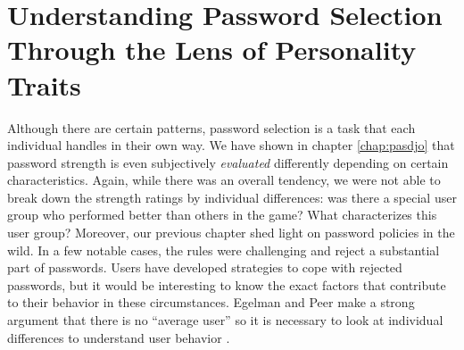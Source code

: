 \chapter[Password Personality]{Understanding Password Selection Through the Lens of Personality Traits}\label{chap:pws_and_personality}

Although there are certain patterns, password selection is a task that each individual handles in their own way. 
We have shown in chapter \ref{chap:pasdjo} that password strength is even subjectively \textit{evaluated} differently depending on certain characteristics. Again, while there was an overall tendency, we were not able to break down the strength ratings by individual differences: was there a special user group who performed better than others in the game? What characterizes this user group? Moreover, our previous chapter shed light on password policies in the wild. In a few notable cases, the rules were challenging and reject a substantial part of passwords. Users have developed strategies to cope with rejected passwords, but it would be interesting to know the exact factors that contribute to their behavior in these circumstances. Egelman and Peer make a strong argument that there is no ``average user'' so it is necessary to look at individual differences to understand user behavior \cite{Egelman2015AverageUser}. 

